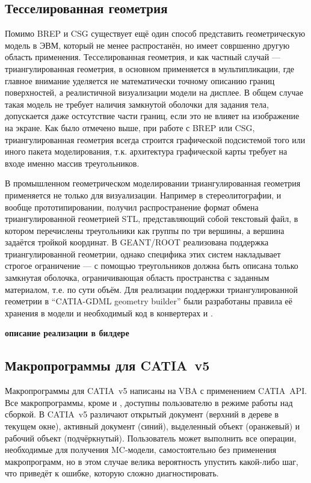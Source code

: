 \subsection{Тесселированная геометрия}\label{sec:Tesselated}

Помимо BREP и CSG существует ещё один способ представить геометрическую модель в ЭВМ, который не менее распростанён, но имеет совршенно другую область применения. Тесселированная геометрия, и как частный случай --- триангулированная геометрия, в основном применяется в мультипликации, где главное внимание уделяется не математически точному описанию границ поверхностей, а реалистичной визуализации модели на дисплее. В общем случае такая модель не требует наличия замкнутой оболочки для задания тела, допускается даже остсутствие части границ, если это не влияет на изображение на экране. Как было отмечено выше, при работе с BREP или CSG, триангулированная геометрия всегда строится графической подсистемой того или иного пакета моделирования, т.к. архитектура графической карты требует на входе именно массив треугольников.

В промышленном геометрическом моделировании триангулированная геометрия применяется не только для визуализации. Например в стереолитографии, и вообще прототипировании, получил распространение формат обмена триангулированной геометрией STL, представляющий собой текстовый файл, в котором перечислены треугольники как группы по три вершины, а вершина задаётся тройкой координат. В GEANT/ROOT реализована поддержка триангулированной геометрии, однако специфика этих систем накладывает строгое ограничение --- с помощью треугольников должна быть описана только замкнутая оболочка, ограничивающая область пространства с заданным материалом, т.е. по сути объём.
Для реализации поддержки триангулированной геометрии в ``CATIA-GDML geometry builder'' были разработаны правила её хранения в модели и необходимый код в конвертерах  и .

\todo \textbf{описание реализации в билдере}

\subsection{Макропрограммы для CATIA~v5}\label{sec:Macros}

Макропрограммы для CATIA~v5 написаны на VBA с применением CATIA~API. Все макропрограммы, кроме  и , доступны пользователю в режиме работы над сборкой. В CATIA~v5 различают открытый документ (верхний в дереве в текущем окне), активный документ (синий), выделенный объект (оранжевый) и рабочий объект (подчёркнутый). Пользователь может выполнить все операции, необходимые для получения MC-модели, самостоятельно без применения макропрограмм, но в этом случае велика вероятность упустить какой-либо шаг, что приведёт к ошибке, которую сложно диагностировать.

